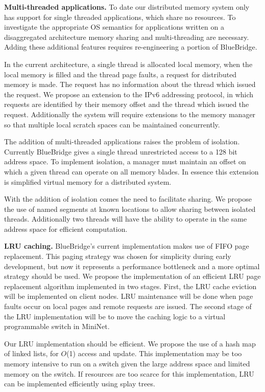 \textbf{Multi-threaded applications.} To date our
distributed memory system only has support for single threaded
applications, which share no resources. To investigate the appropriate
OS semantics for applications written on a disaggregated architecture
memory sharing and multi-threading are necessary. Adding these
additional features requires re-engineering a portion of BlueBridge.

In the current architecture, a single thread is allocated local
memory, when the local memory is filled and the thread
page faults, a request for distributed memory is made. The request has
no information about the thread which issued the request. We propose an
extension to the IPv6 addressing protocol, in which requests are
identified by their memory offset and the thread which issued the
request. Additionally the system will require extensions to the memory
manager so that multiple local scratch spaces can be maintained
concurrently.

The addition of multi-threaded applications raises the problem of
isolation. Currently BlueBridge gives a single thread unrestricted
access to a 128 bit address space. To implement isolation, a manager
must maintain an offset on which a given thread can operate on all
memory blades. In essence this extension is simplified virtual memory
for a distributed system.

With the addition of isolation comes the need to facilitate sharing.
We propose the use of named segments at known locations to allow
sharing between isolated threads. Additionally two threads will have
the ability to operate in the same address space for efficient
computation.

\textbf{LRU caching.} BlueBridge's current implementation
makes use of FIFO page replacement. This paging strategy was chosen
for simplicity during early development, but now it represents a
performance bottleneck and a more optimal strategy should be used. We
propose the implementation of an efficient LRU page replacement
algorithm implemented in two stages. First, the LRU cache eviction
will be implemented on client nodes. LRU maintenance will be done when
page faults occur on local pages and remote requests are issued. The
second stage of the LRU implementation will be to move the caching
logic to a virtual programmable switch in MiniNet.

Our LRU implementation should be efficient. We propose the use of a
hash map of linked lists, for $O$(1) access and update. This implementation may
be too memory intensive to run on a switch given the large address
space and limited memory on the switch. If resources are too scarce
for this implementation, LRU can be implemented efficiently using
splay trees.

